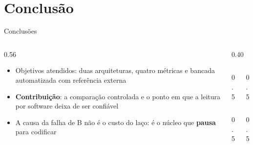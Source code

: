 \documentclass{UFAL-beamer-moderno}
\begin{document}
\section{Conclusão}

\begin{frame}{Conclusões}
  \begin{columns}[T]
    \begin{column}{0.56\textwidth}
      \begin{itemize}
        \setlength{\itemsep}{8pt}
        \item Objetivos atendidos: duas arquiteturas, quatro métricas e bancada
              automatizada com referência externa
        \item \textbf{Contribuição}: a comparação controlada e o ponto em que a
              leitura por software deixa de ser confiável
        \item A causa da falha de B não é o custo do laço: é o núcleo que
              \textbf{pausa} para codificar
      \end{itemize}
    \end{column}
    \begin{column}{0.40\textwidth}
      \begin{columns}[T]
        \begin{column}{0.5\linewidth}
        \end{column}
        \begin{column}{0.5\linewidth}
        \end{column}
      \end{columns}
      \vspace{14pt}
      \begin{columns}[T]
        \begin{column}{0.5\linewidth}
        \end{column}
        \begin{column}{0.5\linewidth}
        \end{column}
      \end{columns}
    \end{column}
  \end{columns}
\end{frame}
\end{document}
